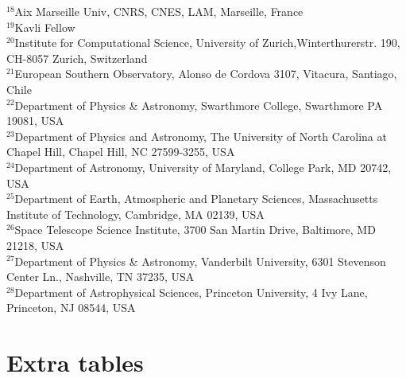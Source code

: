 \documentclass[fleqn,usenatbib]{mnras}
\begin{document}
$^{18}$Aix Marseille Univ, CNRS, CNES, LAM, Marseille, France\\
$^{19}$Kavli Fellow\\
$^{20}$Institute for Computational Science, University of Zurich,Winterthurerstr. 190, CH-8057 Zurich, Switzerland\\
$^{21}$European Southern Observatory, Alonso de Cordova 3107, Vitacura, Santiago, Chile\\
$^{22}$Department of Physics \& Astronomy, Swarthmore College, Swarthmore PA 19081, USA\\
$^{23}$Department of Physics and Astronomy, The University of North Carolina at Chapel Hill, Chapel Hill, NC 27599-3255, USA\\
$^{24}$Department of Astronomy, University of Maryland, College Park, MD 20742, USA\\
$^{25}$Department of Earth, Atmospheric and Planetary Sciences, Massachusetts Institute of Technology, Cambridge, MA 02139, USA\\
$^{26}$Space Telescope Science Institute, 3700 San Martin Drive, Baltimore, MD 21218, USA\\
$^{27}$Department of Physics \& Astronomy, Vanderbilt University, 6301 Stevenson Center Ln., Nashville, TN 37235, USA\\
$^{28}$Department of Astrophysical Sciences, Princeton University, 4 Ivy Lane, Princeton, NJ 08544, USA\\

\section{Extra tables}
\end{document}
